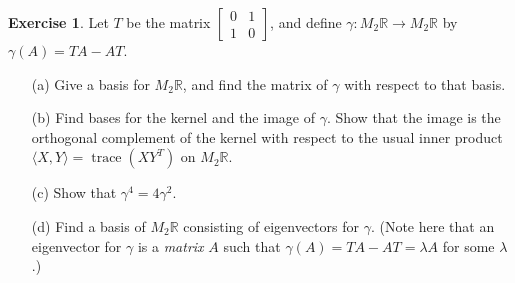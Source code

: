 \documentclass{amsart}
\newcommand{\R}         {{\mathbb{R}}}
\newcommand{\trc}       {\operatorname{trace}}
\newcommand{\bbm}       {\left[\begin{matrix}}
\newcommand{\ebm}       {\end{matrix}\right]}
\newcommand{\gm}        {\gamma}
\newcommand{\lm}        {\lambda}
\newcommand{\ip}[1]     {\langle #1\rangle}
\renewcommand{\:}       {\colon}
\theoremstyle{definition}
\newtheorem{exercise}{Exercise}[section]
\begin{document}
\begin{exercise}\label{ex-commutator}
 Let $T$ be the matrix $\bbm 0&1\\1&0\ebm$, and define
 $\gm\:M_2\R\to M_2\R$ by $\gm(A)=TA-AT$.
 \begin{itemize}
  \item[(a)] Give a basis for $M_2\R$, and find the matrix of
  $\gm$ with respect to that basis.
  \item[(b)] Find bases for the kernel and the image of $\gm$.
  Show that the image is the orthogonal complement of the kernel
  with respect to the usual inner product $\ip{X,Y}=\trc(XY^T)$
  on $M_2\R$.
  \item[(c)] Show that $\gm^4=4\gm^2$.
  \item[(d)] Find a basis of $M_2\R$ consisting of eigenvectors
  for $\gm$.  (Note here that an eigenvector for $\gm$ is a
  \emph{matrix} $A$ such that $\gm(A)=TA-AT=\lm A$ for some
  $\lm$.)
 \end{itemize}
\end{exercise}
\end{document}
